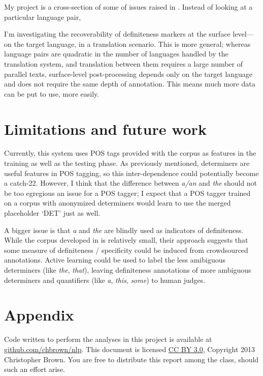 \documentclass[11pt]{article}
\begin{document}
My project is a cross-section of some of issues raised in \citet{siegel:1996}. Instead of looking at a particular language pair,

I'm investigating the recoverability of definiteness markers at the surface level---on the target language, in a translation scenario. This is more general; whereas language pairs are quadratic in the number of languages handled by the translation system, and translation between them requires a large number of parallel texts, surface-level post-processing depends only on the target language and does not require the same depth of annotation. This means much more data can be put to use, more easily.







\section{Limitations and future work}

Currently, this system uses POS tags provided with the corpus as features in the training as well as the testing phase. As previously mentioned, determiners are useful features in POS tagging, so this inter-dependence could potentially become a catch-22. However, I think that the difference between \emph{a/an} and \emph{the} should not be too egregious an issue for a POS tagger; I expect that a POS tagger trained on a corpus with anonymized determiners would learn to use the merged placeholder `DET' just as well.

A bigger issue is that \emph{a} and \emph{the} are blindly used as indicators of definiteness. While the corpus developed in \citet{vieira:2000} is relatively small, their approach suggests that some measure of definiteness / specificity could be induced from crowdsourced annotations. Active learning could be used to label the less amibiguous determiners (like \emph{the}, \emph{that}), leaving definiteness annotations of more ambiguous determiners and quantifiers (like \emph{a}, \emph{this}, \emph{some}) to human judges.

\section*{Appendix}

Code written to perform the analyses in this project is available at \href{https://github.com/chbrown/nlp}{github.com/chbrown/nlp}.
This document is licensed \href{http://creativecommons.org/licenses/by/3.0/}{CC BY 3.0}, Copyright 2013 Christopher Brown.
You are free to distribute this report among the class, should such an effort arise.


\end{document}
